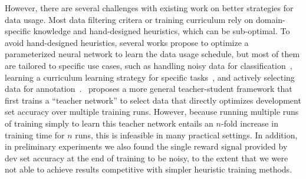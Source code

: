 However, there are several challenges with existing work on better strategies for data usage. Most data filtering critera or training curriculum rely on domain-specific knowledge and hand-designed heuristics, which can be sub-optimal. To avoid hand-designed heuristics, several works propose to optimize a parameterized neural network to learn the data usage schedule, but most of them are tailored to specific use cases, such as handling noisy data for classification~\citep{mentornet}, learning a curriculum learning strategy for specific tasks~\citep{rl_nmt,baysian_curriculum}, and actively selecting data for annotation~\citep{learn_active_learn,reinforce_cotrain}.
\citet{learn_to_teach}~proposes a more general teacher-student framework that first trains a ``teacher network'' to select data that directly optimizes development set accuracy over multiple training runs.
However, because running multiple runs of training simply to learn this teacher network entails an $n$-fold increase in training time for $n$ runs, this is infeasible in many practical settings.
In addition, in preliminary experiments we also found the single reward signal provided by dev set accuracy at the end of training to be noisy, to the extent that we were not able to achieve results competitive with simpler heuristic training methods.



